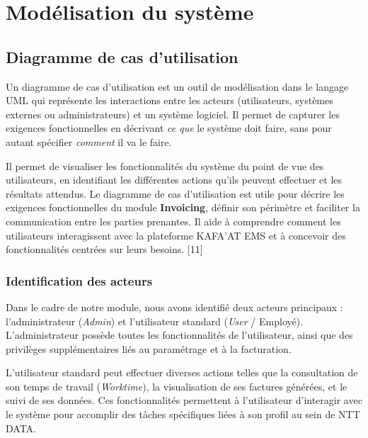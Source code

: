 \documentclass[12pt, a4paper, openany]{report}
\begin{document}
\vspace{-0.6cm}


\section{Modélisation du système}

\vspace{-0.7cm}
\subsection{Diagramme de cas d'utilisation}

\vspace{-0.4cm}
Un diagramme de cas d'utilisation est un outil de modélisation dans le langage UML qui représente les interactions entre les acteurs (utilisateurs, systèmes externes ou administrateurs) et un système logiciel. Il permet de capturer les exigences fonctionnelles en décrivant \textit{ce que} le système doit faire, sans pour autant spécifier \textit{comment} il va le faire.

Il permet de visualiser les fonctionnalités du système du point de vue des utilisateurs, en identifiant les différentes actions qu'ils peuvent effectuer et les résultats attendus. Le diagramme de cas d'utilisation est utile pour décrire les exigences fonctionnelles du module \textbf{Invoicing}, définir son périmètre et faciliter la communication entre les parties prenantes. Il aide à comprendre comment les utilisateurs interagissent avec la plateforme KAFA'AT EMS et à concevoir des fonctionnalités centrées sur leurs besoins. [11]

\vspace{-0.5cm}
\subsubsection{Identification des acteurs}

\vspace{-0.4cm}
Dans le cadre de notre module, nous avons identifié deux acteurs principaux : l'administrateur (\textit{Admin}) et l'utilisateur standard (\textit{User} / Employé). L'administrateur possède toutes les fonctionnalités de l'utilisateur, ainsi que des privilèges supplémentaires liés au paramétrage et à la facturation.

L'utilisateur standard peut effectuer diverses actions telles que la consultation de son temps de travail (\textit{Worktime}), la visualisation de ses factures générées, et le suivi de ses données. Ces fonctionnalités permettent à l'utilisateur d'interagir avec le système pour accomplir des tâches spécifiques liées à son profil au sein de NTT DATA.
\end{document}
